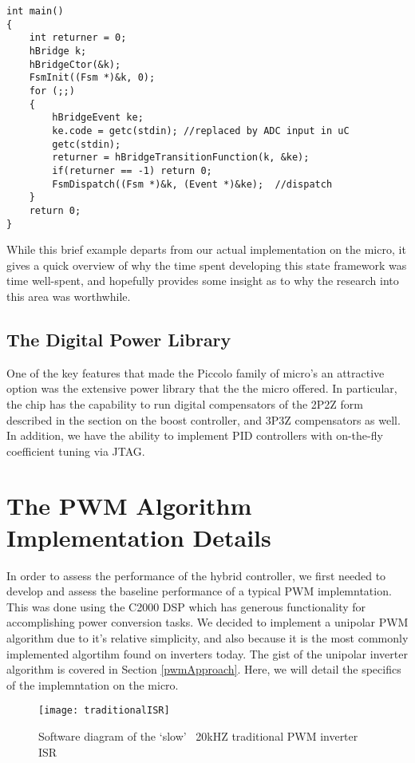 \begin{lstlisting}
int main()
{
    int returner = 0;
    hBridge k;
    hBridgeCtor(&k);
    FsmInit((Fsm *)&k, 0);
    for (;;)
    {
        hBridgeEvent ke;                   
        ke.code = getc(stdin); //replaced by ADC input in uC           
        getc(stdin);                      
        returner = hBridgeTransitionFunction(k, &ke);
        if(returner == -1) return 0;
        FsmDispatch((Fsm *)&k, (Event *)&ke);  //dispatch
    }
    return 0;
}
\end{lstlisting}
\hfill \break
\hfill \break
 
While this brief example departs from our actual implementation on the micro, it gives a quick overview of why the time spent developing this state framework was time well-spent, and hopefully provides some insight as to why the research into this area was worthwhile.

\subsection{The Digital Power Library}
One of the key features that made the Piccolo family of micro's an attractive option was the extensive power library that the the micro offered. In particular, the chip has the capability to run digital compensators of the 2P2Z form described in the section on the boost controller, and 3P3Z compensators as well. In addition, we have the ability to implement PID controllers with on-the-fly coefficient tuning via JTAG.

\section{The PWM Algorithm Implementation Details}
In order to assess the performance of the hybrid controller, we first needed to develop and assess the baseline performance of a typical PWM implemntation. This was done using the C2000 DSP which has generous functionality for accomplishing power conversion tasks. We decided to implement a unipolar PWM algorithm due to it's relative simplicity, and also because it is the most commonly implemented algortihm found on inverters today. The gist of the unipolar inverter algorithm is covered in Section \ref{pwmApproach}. Here, we will detail the specifics of the implemntation on the micro.

\begin{figure}[h]
\begin{center}
\texttt{[image: traditionalISR]}
\caption{Software diagram of the `slow' ~20kHZ traditional PWM inverter ISR}
\label{fast}
\end{center}
\end{figure}

